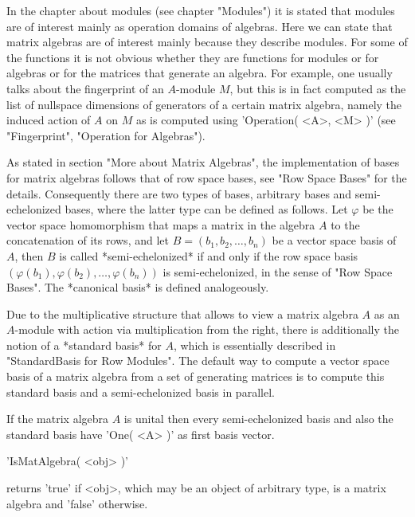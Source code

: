In the chapter about modules (see chapter "Modules") it is stated that
modules are of interest mainly as operation domains of algebras.  Here
we can state that matrix algebras are of interest mainly because they
describe modules.  For some of the functions it is not obvious whether
they are functions for modules or for algebras or for the matrices that
generate an algebra.  For example, one usually talks about the
fingerprint of an $A$-module $M$, but this is in fact computed as the
list of nullspace dimensions of generators of a certain matrix algebra,
namely the induced action of $A$ on $M$ as is computed using
'Operation( <A>, <M> )' (see "Fingerprint", "Operation for Algebras").


As stated in section "More about Matrix Algebras", the implementation of
bases for matrix algebras follows that of row space bases, see "Row Space
Bases" for the details.  Consequently there are two types of bases,
arbitrary bases and semi-echelonized bases, where the latter type can be
defined as follows.  Let $\varphi$ be the vector space homomorphism that
maps a matrix in the algebra $A$ to the concatenation of its rows, and
let $B = (b_1, b_2, \ldots, b_n)$ be a vector space basis of $A$, then
$B$ is called *semi-echelonized* if and only if the row space basis
$(\varphi(b_1), \varphi(b_2), \ldots, \varphi(b_n))$ is semi-echelonized,
in the sense of "Row Space Bases".  The *canonical basis* is defined
analogeously.

Due to the multiplicative structure that allows to view a matrix algebra
$A$ as an $A$-module with action via multiplication from the right,
there is additionally the notion of a *standard basis* for $A$, which is
essentially described in "StandardBasis for Row Modules".  The default way
to compute a vector space basis of a matrix algebra from a set of
generating matrices is to compute this standard basis and a
semi-echelonized basis in parallel.

If the matrix algebra $A$ is unital then every semi-echelonized basis and
also the standard basis have 'One( <A> )' as first basis vector.


'IsMatAlgebra( <obj> )'

returns 'true' if <obj>, which may be an object of arbitrary type, is a
matrix algebra and 'false' otherwise.

